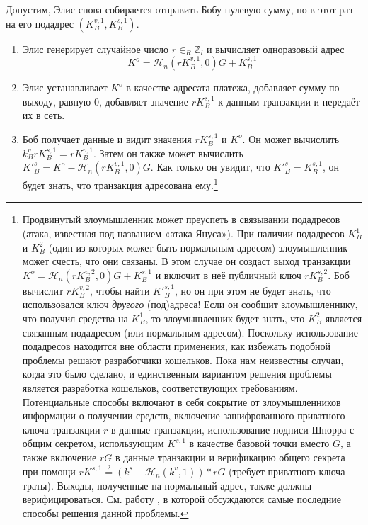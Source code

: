 Допустим, Элис снова собирается отправить Бобу нулевую сумму, но в этот раз на его подадрес $(K_B^{v,1}, K_B^{s,1})$.
\begin{enumerate}
	\item Элис генерирует случайное число $r \in_R \mathbb{Z}_l$ и вычисляет одноразовый адрес\vspace{.175cm}
	\[ K^o  = \mathcal{H}_n(r K_B^{v,1},0)G + K_B^{s,1} \]

	\item Элис устанавливает $K^o$ в качестве адресата платежа, добавляет сумму по выходу, равную 0, добавляет значение $r K_B^{s,1}$ к данным транзакции и передаёт их в сеть.
	
	\item Боб получает данные и видит значения $r K_B^{s,1}$ и $K^o$. Он может вычислить $k_B^v r K_B^{s,1} = r K_B^{v,1}$. Затем он также может вычислить $K'^{s}_B = K^o - \mathcal{H}_n(r K_B^{v,1},0)G$. Как только он увидит, что $K'^{s}_B = K^{s,1}_B$, он будет знать, что транзакция адресована ему.\footnote{Продвинутый злоумышленник  может преуспеть в связывании подадресов \cite{janus-attack} (атака, известная под названием «атака Януса»). При наличии подадресов $K_B^1$ $ и $ $K_B^2$ (один из которых может быть нормальным адресом) злоумышленник может счесть, что они связаны. В этом случае он создаст выход транзакции $K^o = \mathcal{H}_n(r K_B^{v,2},0)G + K_B^{s,1}$ и включит в неё публичный ключ $r K_B^{s,2}$. Боб вычислит $r K_B^{v,2}$, чтобы найти $K'^{s,1}_B$, но он при этом не будет знать, что использовался ключ {\em другого} (под)адреса! Если он сообщит злоумышленнику, что получил средства на $K_B^1$, то злоумышленник будет знать, что $K_B^2$ является связанным подадресом (или нормальным адресом). Поскольку использование подадресов находится вне области применения, как избежать подобной проблемы решают разработчики кошельков. Пока нам неизвестны случаи, когда это было сделано, и единственным вариантом решения проблемы является разработка кошельков, соответствующих требованиям. Потенциальные способы включают в себя сокрытие от злоумышленников информации о получении средств, включение зашифрованного приватного ключа транзакции $r$ в данные транзакции, использование подписи Шнорра с общим секретом, использующим $K^{s,1}$ в качестве базовой точки вместо $G$, а также включение $rG$ в данные транзакции и верификацию общего секрета при помощи $rK^{s,1} \stackrel{?}{=} (k^s + \mathcal{H}_n(k^v, 1))*rG$ (требует приватного ключа траты). Выходы, полученные на нормальный адрес, также должны верифицироваться. См. работу \cite{janus-mitigation-issue-62}, в которой обсуждаются самые последние способы решения данной проблемы.}
	

\end{enumerate}
